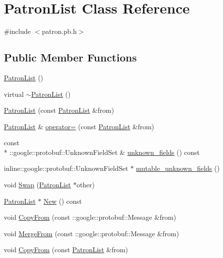 \hypertarget{classPatronList}{\section{Patron\-List Class Reference}
\label{classPatronList}
}


{\ttfamily \#include $<$patron.\-pb.\-h$>$}

\subsection*{Public Member Functions}
\begin{DoxyCompactItemize}
\item 
\hyperlink{classPatronList_af1c10e00e8468c9dc1c4f999a59a12e2}{Patron\-List} ()
\item 
virtual \hyperlink{classPatronList_a0cc7f3ea3764ad54fd67209a2559af7f}{$\sim$\-Patron\-List} ()
\item 
\hyperlink{classPatronList_adc75f5233ac7feed3df55f72e1157c9b}{Patron\-List} (const \hyperlink{classPatronList}{Patron\-List} \&from)
\item 
\hyperlink{classPatronList}{Patron\-List} \& \hyperlink{classPatronList_ace3ee9754d1a49788684821b55f3357d}{operator=} (const \hyperlink{classPatronList}{Patron\-List} \&from)
\item 
const \\*
\-::google\-::protobuf\-::\-Unknown\-Field\-Set \& \hyperlink{classPatronList_a4f6cb580e928518b92a3f6d7694e0a3d}{unknown\-\_\-fields} () const 
\item 
inline\-::google\-::protobuf\-::\-Unknown\-Field\-Set $\ast$ \hyperlink{classPatronList_a28f22b8c3ce1bddde19655049215f0c7}{mutable\-\_\-unknown\-\_\-fields} ()
\item 
void \hyperlink{classPatronList_a3891ce87fd40823015ce395b767450aa}{Swap} (\hyperlink{classPatronList}{Patron\-List} $\ast$other)
\item 
\hyperlink{classPatronList}{Patron\-List} $\ast$ \hyperlink{classPatronList_af78b8ba4a1c2b3b5553b8047f91c0e24}{New} () const 
\item 
void \hyperlink{classPatronList_a7dd6ae78ac88cef08dd3746f09fd4c51}{Copy\-From} (const \-::google\-::protobuf\-::\-Message \&from)
\item 
void \hyperlink{classPatronList_a40d6d2ae84a046ba2b3107483380a529}{Merge\-From} (const \-::google\-::protobuf\-::\-Message \&from)
\item 
void \hyperlink{classPatronList_ab26195eab56b3cb743302a9850531de4}{Copy\-From} (const \hyperlink{classPatronList}{Patron\-List} \&from)

\end{DoxyCompactItemize}

